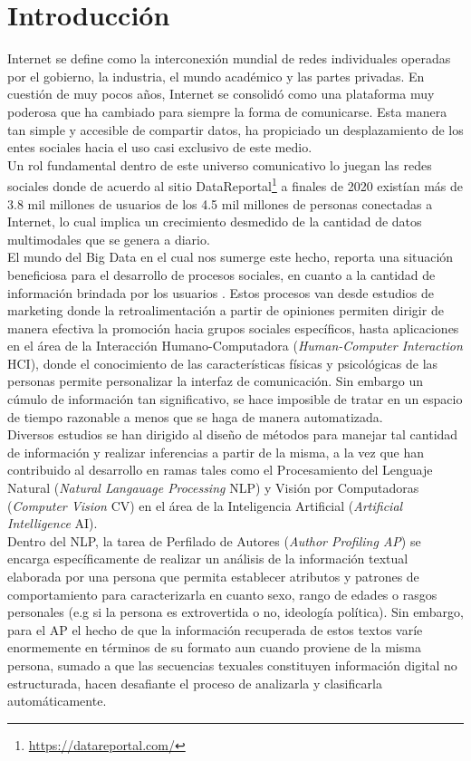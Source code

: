 \chapter*{Introducción}



Internet se define como la interconexión mundial de redes individuales operadas por el gobierno, la industria, el mundo académico y las partes privadas. En cuestión de muy pocos años, Internet se consolidó como una plataforma muy poderosa que ha cambiado para siempre la forma de comunicarse.  Esta manera tan simple y accesible de compartir datos, ha propiciado un desplazamiento de los entes sociales hacia el uso casi exclusivo de este medio.
\\
Un rol fundamental dentro de este universo comunicativo lo juegan las redes sociales donde de acuerdo al sitio DataReportal\footnote{\url{https://datareportal.com/}} a finales de 2020 existían más de 3.8 mil millones de usuarios de los 4.5 mil millones de personas conectadas a Internet, lo cual implica un crecimiento desmedido de la cantidad de datos multimodales que se genera a diario.
\\
El mundo del Big Data \citep{Riahi2018BigDA} en el cual nos sumerge este hecho, reporta una situación beneficiosa para el desarrollo de procesos sociales, en cuanto a la cantidad de información brindada por los usuarios . 
Estos procesos van desde estudios de marketing donde la retroalimentación a partir de opiniones permiten dirigir de manera efectiva la promoción hacia grupos sociales específicos, hasta aplicaciones en el área de la Interacción Humano-Computadora (\textit{Human-Computer Interaction }HCI), donde el conocimiento de las características físicas y psicológicas de las personas permite personalizar la interfaz de comunicación. Sin embargo un cúmulo de información tan significativo, se hace imposible de tratar en un espacio de tiempo razonable a menos que se haga de manera automatizada.
\\
Diversos estudios se han dirigido al diseño de métodos para manejar tal cantidad de información y realizar inferencias a partir de la misma, a la vez que han contribuido al desarrollo en ramas tales como el Procesamiento del Lenguaje Natural (\textit{Natural Langauage Processing} NLP) y Visión por Computadoras (\textit{Computer Vision} CV) en el área de la Inteligencia Artificial (\textit{Artificial Intelligence} AI).
\\ 
Dentro del NLP, la tarea de Perfilado de Autores (\textit{Author Profiling AP}) \citep{Rosso2019,article} se encarga específicamente de realizar un análisis de la información textual elaborada por una persona que permita establecer atributos y patrones de comportamiento para caracterizarla en cuanto sexo, rango de edades o rasgos personales (e.g si la persona es extrovertida o no, ideología política). Sin embargo, para el AP el hecho de que la información recuperada de estos textos varíe enormemente en términos de su formato aun cuando proviene de la misma persona, sumado a que las secuencias texuales constituyen información digital no estructurada, hacen desafiante el proceso de analizarla y clasificarla automáticamente. 
